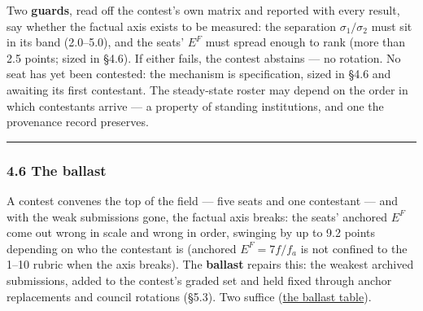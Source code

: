 Two \textbf{guards}, read off the contest's own matrix and reported with every result, say whether the factual axis exists to be measured: the separation \(\sigma_1/\sigma_2\) must sit in its band (2.0--5.0), and the seats' \(E^{F}\) must spread enough to rank (more than 2.5 points; sized in §4.6). If either fails, the contest abstains --- no rotation. No seat has yet been contested: the mechanism is specification, sized in §4.6 and awaiting its first contestant. The steady-state roster may depend on the order in which contestants arrive --- a property of standing institutions, and one the provenance record preserves.

\begin{center}\rule{0.5\linewidth}{0.5pt}\end{center}

\subsubsection{4.6 The ballast}\label{the-ballast}

A contest convenes the top of the field --- five seats and one contestant --- and with the weak submissions gone, the factual axis breaks: the seats' anchored \(E^{F}\) come out wrong in scale and wrong in order, swinging by up to 9.2 points depending on who the contestant is (anchored \(E^{F}=7f/f_a\) is not confined to the 1--10 rubric when the axis breaks). The \textbf{ballast} repairs this: the weakest archived submissions, added to the contest's graded set and held fixed through anchor replacements and council rotations (§5.3). Two suffice (\hyperref[tab-ballast]{the ballast table}).

\protect{}\label{tab-ballast}{}

